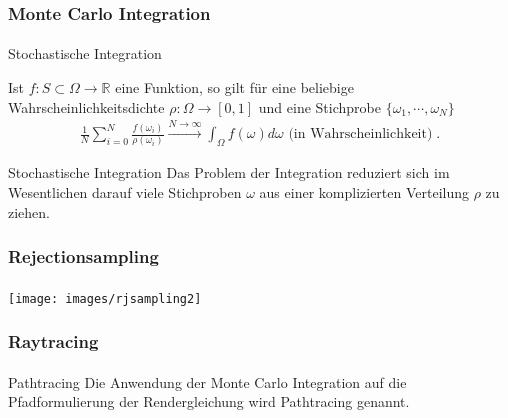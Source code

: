 \documentclass{beamer}
\begin{document}
\begin{frame}
    \frametitle{Monte Carlo Integration}
\framesubtitle{}
\begin{block}{Stochastische Integration}

Ist $f: S \subset \Omega \to \mathbb{R}$ eine Funktion, so gilt für eine beliebige Wahrscheinlichkeitsdichte  $\rho: \Omega \to [0,1]$ und eine Stichprobe 
 $\{ \omega_1, \cdots, \omega_N \}$
\begin{align}
\frac{1}{N} \sum_{i= 0}^{N}  \frac{f(\omega_i)}{\rho(\omega_i)} \xrightarrow{ N \to \infty } \int_{\Omega} f(\omega) d\omega \text{ (in Wahrscheinlichkeit)} \; .
\end{align}
\end{block}

\begin{block}{Stochastische Integration}
Das Problem der Integration reduziert sich im Wesentlichen darauf viele Stichproben $\omega$ aus einer komplizierten  Verteilung  $\rho$ zu ziehen.
\end{block}

\end{frame}

\begin{frame}
    \frametitle{Rejectionsampling}
\framesubtitle{}

  \begin{center}
    \texttt{[image: images/rjsampling2]}
\end{center}

\end{frame}



\begin{frame}
    \frametitle{Raytracing}
\framesubtitle{}
\begin{block}{Pathtracing}
Die Anwendung der Monte Carlo Integration auf die Pfadformulierung der Rendergleichung wird Pathtracing genannt.
\end{block}
\end{frame}
\end{document}
